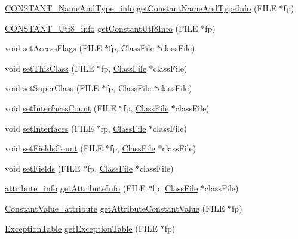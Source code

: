 \begin{DoxyCompactItemize}
\item 
\hyperlink{structCONSTANT__NameAndType__info}{C\+O\+N\+S\+T\+A\+N\+T\+\_\+\+Name\+And\+Type\+\_\+info} \hyperlink{classLeitorExibidor_a11acaf5d8c110037608d86273bf4c24e}{get\+Constant\+Name\+And\+Type\+Info} (F\+I\+LE $\ast$fp)
\item 
\hyperlink{structCONSTANT__Utf8__info}{C\+O\+N\+S\+T\+A\+N\+T\+\_\+\+Utf8\+\_\+info} \hyperlink{classLeitorExibidor_ac377ddc183e03ec12941e8bd557104f7}{get\+Constant\+Utf8\+Info} (F\+I\+LE $\ast$fp)
\item 
void \hyperlink{classLeitorExibidor_a7934c3a6d4da59ecb351d32b74240c60}{set\+Access\+Flags} (F\+I\+LE $\ast$fp, \hyperlink{classClassFile}{Class\+File} $\ast$class\+File)
\item 
void \hyperlink{classLeitorExibidor_af0f402911ed326bd9e495eef93a43c24}{set\+This\+Class} (F\+I\+LE $\ast$fp, \hyperlink{classClassFile}{Class\+File} $\ast$class\+File)
\item 
void \hyperlink{classLeitorExibidor_af726ef535e88d9d86938a2d6aad6658c}{set\+Super\+Class} (F\+I\+LE $\ast$fp, \hyperlink{classClassFile}{Class\+File} $\ast$class\+File)
\item 
void \hyperlink{classLeitorExibidor_afbe776f3eb57a38dde0bfe862dd5650a}{set\+Interfaces\+Count} (F\+I\+LE $\ast$fp, \hyperlink{classClassFile}{Class\+File} $\ast$class\+File)
\item 
void \hyperlink{classLeitorExibidor_aff26e69a60fa1285388e300ac7ec3342}{set\+Interfaces} (F\+I\+LE $\ast$fp, \hyperlink{classClassFile}{Class\+File} $\ast$class\+File)
\item 
void \hyperlink{classLeitorExibidor_af325d9f6276a66c6bac95b09e83405c9}{set\+Fields\+Count} (F\+I\+LE $\ast$fp, \hyperlink{classClassFile}{Class\+File} $\ast$class\+File)
\item 
void \hyperlink{classLeitorExibidor_a682c7ad4fd18b4dce390285c3c643b7b}{set\+Fields} (F\+I\+LE $\ast$fp, \hyperlink{classClassFile}{Class\+File} $\ast$class\+File)
\item 
\hyperlink{structattribute__info}{attribute\+\_\+info} \hyperlink{classLeitorExibidor_a81a7c01ab5ad3fb4fb1bb524d85ee5c0}{get\+Attribute\+Info} (F\+I\+LE $\ast$fp, \hyperlink{classClassFile}{Class\+File} $\ast$class\+File)
\item 
\hyperlink{structConstantValue__attribute}{Constant\+Value\+\_\+attribute} \hyperlink{classLeitorExibidor_a90079e579d24fc03705b624a906709e3}{get\+Attribute\+Constant\+Value} (F\+I\+LE $\ast$fp)
\item 
\hyperlink{structExceptionTable}{Exception\+Table} \hyperlink{classLeitorExibidor_afc06b4ce567e2b0d2c26ad0fc797f735}{get\+Exception\+Table} (F\+I\+LE $\ast$fp)

\end{DoxyCompactItemize}
